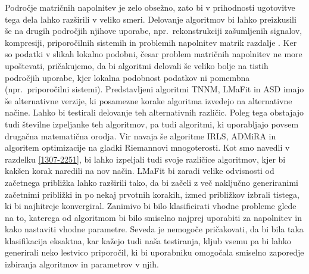 Področje matričnih napolnitev je zelo obsežno, zato bi v prihodnosti ugotovitve tega dela lahko razširili v veliko smeri.
Delovanje algoritmov bi lahko preizkusili še na drugih področjih njihove uporabe, npr.\ rekonstrukciji zašumljenih signalov, kompresiji, priporočilnih sistemih in problemih napolnitev matrik razdalje \cite{Survey-NKS19}.
Ker so podatki v slikah lokalno podobni, česar problem matričnih napolnitev ne more upoštevati, pričakujemo, da bi algoritmi delovali še veliko bolje na tistih področjih uporabe, kjer lokalna podobnost podatkov ni pomembna (npr.\ priporočilni sistemi).
Predstavljeni algoritmi TNNM, LMaFit in ASD imajo še alternativne verzije, ki posamezne korake algoritma izvedejo na alternativne načine. Lahko bi testirali delovanje teh alternativnih različic. Poleg tega obstajajo tudi številne izpeljanke teh algoritmov,
pa tudi algoritmi, ki uporabljajo povsem drugačna matematična orodja. Vir \cite{Survey-NKS19} navaja še algoritme IRLS, ADMiRA in algoritem optimizacije na gladki Riemannovi mnogoterosti. Kot smo navedli v razdelku \ref{1307-2251}, bi lahko izpeljali tudi svoje različice algoritmov, kjer bi kakšen korak naredili na nov način. LMaFit bi zaradi velike odvisnosti od začetnega približka lahko razširili tako, da bi začeli z več naključno generiranimi začetnimi približki in po nekaj prvotnih korakih, izmed približkov izbrali tistega, ki bi najhitreje konvergiral. Zanimivo bi bilo klasificirati vhodne probleme glede na to, katerega od algoritmom bi bilo smiselno najprej uporabiti za napolnitev in kako nastaviti vhodne parametre. Seveda je nemogoče pričakovati, da bi bila taka klasifikacija eksaktna, kar kažejo tudi naša testiranja, kljub vsemu pa bi lahko generirali neko lestvico priporočil, ki bi uporabniku omogočala smiselno zaporedje izbiranja algoritmov in parametrov v njih.